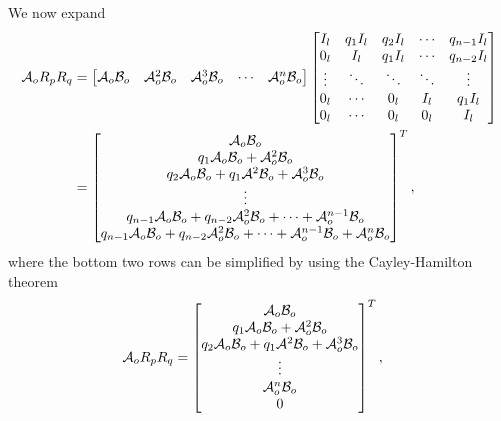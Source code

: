 We now expand
\begin{equation*}
    \begin{split}
        \mathcal{A}_oR_pR_q &= 
        \begin{bmatrix}
            \mathcal{A}_o\mathcal{B}_o & \mathcal{A}^2_o\mathcal{B}_o & \mathcal{A}^{3}_o\mathcal{B}_o & \cdots & \mathcal{A}^{n}_o\mathcal{B}_o \\
        \end{bmatrix}
        \begin{bmatrix}
            I_l & q_1I_l & q_2I_l & \cdots & q_{n-1}I_l \\
            0_l & I_l & q_1I_l & \cdots & q_{n-2}I_l \\
            \vdots & \ddots & \ddots & \ddots & \vdots \\
            0_l & \cdots & 0_l & I_l & q_1I_l \\
            0_l & \cdots & 0_l & 0_l & I_l \\
        \end{bmatrix} \\
        &=
        \begin{bmatrix}
            \mathcal{A}_o\mathcal{B}_o \\ 
            q_1\mathcal{A}_o\mathcal{B}_o + \mathcal{A}^2_o\mathcal{B}_o \\ 
            q_2\mathcal{A}_o\mathcal{B}_o + q_1\mathcal{A}^2\mathcal{B}_o + \mathcal{A}^3_o\mathcal{B}_o \\ \vdots \\ 
            q_{n-1}\mathcal{A}_o\mathcal{B}_o + q_{n-2}\mathcal{A}^2_o\mathcal{B}_o + \cdots + \mathcal{A}^{n-1}_o\mathcal{B}_o \\
            q_{n-1}\mathcal{A}_o\mathcal{B}_o + q_{n-2}\mathcal{A}^2_o\mathcal{B}_o + \cdots + \mathcal{A}^{n-1}_o\mathcal{B}_o + \mathcal{A}^n_o\mathcal{B}_o \\
        \end{bmatrix}^T,
    \end{split}
\end{equation*}
where the bottom two rows can be simplified by using the Cayley-Hamilton theorem
\begin{equation*}
    \begin{split}
        \mathcal{A}_oR_pR_q &= 
        \begin{bmatrix}
            \mathcal{A}_o\mathcal{B}_o \\ 
            q_1\mathcal{A}_o\mathcal{B}_o + \mathcal{A}^2_o\mathcal{B}_o \\ 
            q_2\mathcal{A}_o\mathcal{B}_o + q_1\mathcal{A}^2\mathcal{B}_o + \mathcal{A}^3_o\mathcal{B}_o \\ \vdots \\ 
            \mathcal{A}^{n}_o\mathcal{B}_o \\
            0 \\
        \end{bmatrix}^T,
    \end{split}
\end{equation*}
